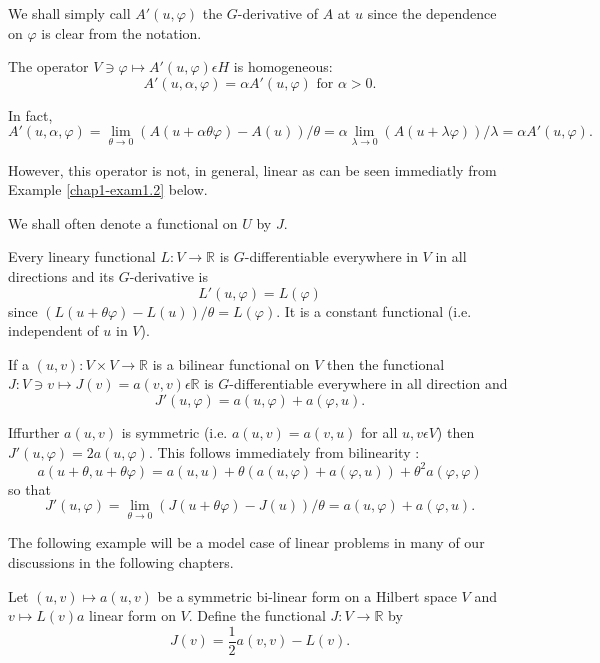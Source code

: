 We shall simply call $A'(u, \varphi)$ the $G$-derivative of $A$ at $u$ since the dependence on $\varphi$ is clear from the notation.

\begin{remark}\label{chap1-rem1.1}
The operator $V \ni \varphi \mapsto A' (u, \varphi) \epsilon H$ is homogeneous:
$$
A'(u, \alpha, \varphi) = \alpha A' (u, \varphi) \text{ for } \alpha > 0.
$$
\end{remark}

In fact,
$$
A'(u, \alpha, \varphi) = \lim_{\theta \to 0} (A(u+\alpha \theta \varphi)-A(u))/ \theta = \alpha \lim_{\lambda \to 0} (A(u+\lambda \varphi))/ \lambda = \alpha A'(u, \varphi).
$$

However, this operator is not, in general, linear as can be seen immediatly from Example \ref{chap1-exam1.2} below.

We shall often denote a functional on $U$ by $J$.

\begin{remark}\label{chap1-rem1.2}
Every lineary functional $L : V \to \mathbb{R}$ is $G$-differentiable everywhere in $V$ in all directions and its $G$-derivative is
$$
L'(u, \varphi) = L(\varphi)
$$
since $(L(u+\theta \varphi) - L(u))/ \theta = L(\varphi)$. It is a constant functional (i.e. independent of $u$ in $V$).
\end{remark}

If a $(u, v) : V \times V \to \mathbb{R}$ is a bilinear functional on $V$ then the functional $J : V \ni v \mapsto J(v) = a(v, v) \epsilon \mathbb{R}$ is $G$-differentiable everywhere in all direction and
$$
J'(u, \varphi) = a(u, \varphi) + a(\varphi, u).
$$ 

If\pageoriginale further $a(u, v)$ is symmetric (i.e. $a(u, v) = a(v, u)$ for all $u, v \epsilon V$) then $J'(u, \varphi) = 2a(u, \varphi)$. This follows immediately from bilinearity :
$$
a(u+\theta, u + \theta \varphi) = a(u, u) + \theta(a(u, \varphi) + a(\varphi, u)) + \theta^{2} a(\varphi, \varphi)
$$
so that
$$
J'(u, \varphi) = \lim_{\theta \to 0} (J(u+\theta \varphi) - J(u))/ \theta = a(u, \varphi) + a(\varphi, u).
$$

The following example will be a model case of linear problems in many of our discussions in the following chapters.

\begin{example}\label{chap1-exam1.1}
Let $(u, v) \mapsto a(u, v)$ be a symmetric bi-linear form on a Hilbert space $V$ and $v \mapsto L(v)a$ linear form on $V$. Define the functional $J : V \to \mathbb{R}$ by
$$
J(v) = \frac{1}{2} a(v, v) - L(v).
$$
\end{example}

